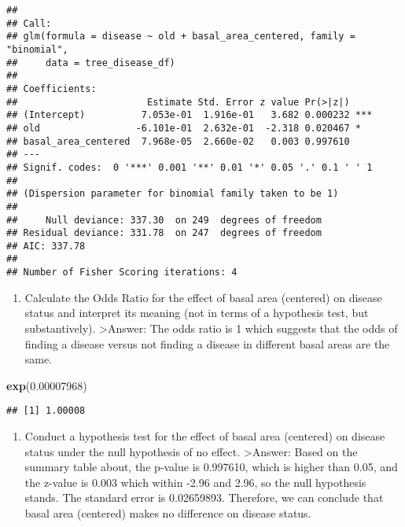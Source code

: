\documentclass[
]{article}
\newenvironment{Shaded}{\begin{snugshade}}{\end{snugshade}}
\newcommand{\FloatTok}[1]{\textcolor[rgb]{0.00,0.00,0.81}{#1}}
\newcommand{\FunctionTok}[1]{\textcolor[rgb]{0.13,0.29,0.53}{\textbf{#1}}}
\newcommand{\NormalTok}[1]{#1}
\providecommand{\tightlist}{%
  \setlength{\itemsep}{0pt}\setlength{\parskip}{0pt}}
\begin{document}
\begin{verbatim}
## 
## Call:
## glm(formula = disease ~ old + basal_area_centered, family = "binomial", 
##     data = tree_disease_df)
## 
## Coefficients:
##                       Estimate Std. Error z value Pr(>|z|)    
## (Intercept)          7.053e-01  1.916e-01   3.682 0.000232 ***
## old                 -6.101e-01  2.632e-01  -2.318 0.020467 *  
## basal_area_centered  7.968e-05  2.660e-02   0.003 0.997610    
## ---
## Signif. codes:  0 '***' 0.001 '**' 0.01 '*' 0.05 '.' 0.1 ' ' 1
## 
## (Dispersion parameter for binomial family taken to be 1)
## 
##     Null deviance: 337.30  on 249  degrees of freedom
## Residual deviance: 331.78  on 247  degrees of freedom
## AIC: 337.78
## 
## Number of Fisher Scoring iterations: 4
\end{verbatim}

\begin{enumerate}
\def\labelenumi{\alph{enumi}.}
\tightlist
\item
  Calculate the Odds Ratio for the effect of basal area (centered) on
  disease status and interpret its meaning (not in terms of a hypothesis
  test, but substantively). \textgreater Answer: The odds ratio is 1
  which suggests that the odds of finding a disease versus not finding a
  disease in different basal areas are the same.
\end{enumerate}

\begin{Shaded}
\begin{Highlighting}[]
\FunctionTok{exp}\NormalTok{(}\FloatTok{0.00007968}\NormalTok{)}
\end{Highlighting}
\end{Shaded}

\begin{verbatim}
## [1] 1.00008
\end{verbatim}

\begin{enumerate}
\def\labelenumi{\alph{enumi}.}
\setcounter{enumi}{1}
\tightlist
\item
  Conduct a hypothesis test for the effect of basal area (centered) on
  disease status under the null hypothesis of no effect.
  \textgreater Answer: Based on the summary table about, the p-value is
  0.997610, which is higher than 0.05, and the z-value is 0.003 which
  within -2.96 and 2.96, so the null hypothesis stands. The standard
  error is 0.02659893. Therefore, we can conclude that basal area
  (centered) makes no difference on disease status.
\end{enumerate}
\end{document}
